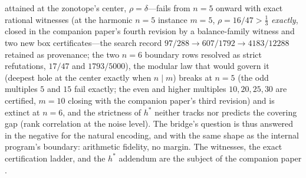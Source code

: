 \begin{enumerate}[leftmargin=1.7em,itemsep=4pt]
  attained at the zonotope's center, $\rho=\delta$---fails from $n=5$
  onward with exact rational witnesses (at the harmonic $n=5$ instance
  $m=5$, $\rho=16/47>\tfrac13$ \emph{exactly}, closed in the companion
  paper's fourth revision by a balance-family witness and two new box
  certificates---the search record
  $97/288\to607/1792\to4183/12288$ retained as provenance; the two
  $n=6$ boundary rows resolved as strict refutations, $17/47$ and
  $1793/5000$), the modular law that would
  govern it (deepest hole at the center exactly when $n\mid m$) breaks
  at $n=5$ (the odd multiples $5$ and $15$ fail exactly; the even and
  higher multiples $10,20,25,30$ are certified, $m=10$ closing with
  the companion paper's third revision) and is extinct at $n=6$, and
  the strictness of $h^*$ neither
  tracks nor predicts the covering gap (rank correlation at the noise
  level). The bridge's question is thus answered in the negative for
  the natural encoding, and with the same shape as the internal
  program's boundary: arithmetic fidelity, no margin. The witnesses,
  the exact certification ladder, and the $h^*$ addendum are the
  subject of the companion paper \cite{companion-paper}.
\end{enumerate}
